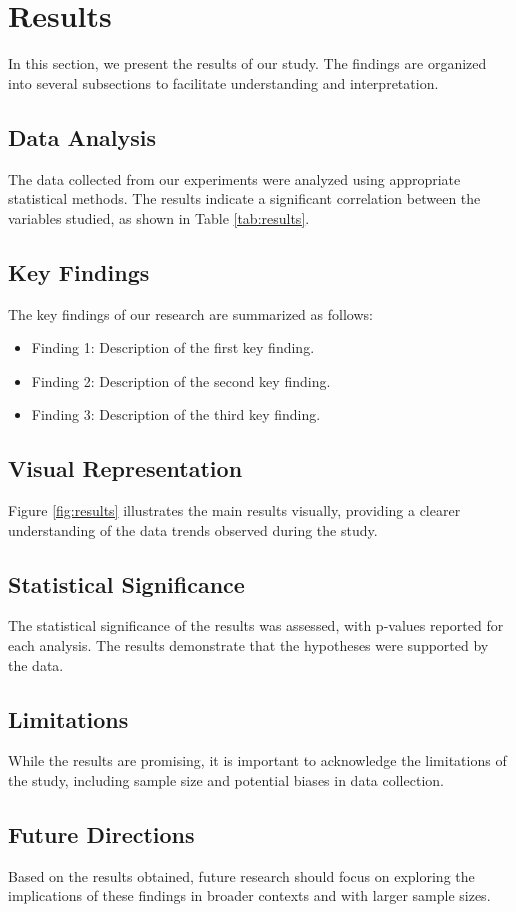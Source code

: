 

\section{Results}

In this section, we present the results of our study. The findings are organized into several subsections to facilitate understanding and interpretation.

\subsection{Data Analysis}
The data collected from our experiments were analyzed using appropriate statistical methods. The results indicate a significant correlation between the variables studied, as shown in Table \ref{tab:results}.

\subsection{Key Findings}
The key findings of our research are summarized as follows:
\begin{itemize}
    \item Finding 1: Description of the first key finding.
    \item Finding 2: Description of the second key finding.
    \item Finding 3: Description of the third key finding.
\end{itemize}

\subsection{Visual Representation}
Figure \ref{fig:results} illustrates the main results visually, providing a clearer understanding of the data trends observed during the study.

\subsection{Statistical Significance}
The statistical significance of the results was assessed, with p-values reported for each analysis. The results demonstrate that the hypotheses were supported by the data.

\subsection{Limitations}
While the results are promising, it is important to acknowledge the limitations of the study, including sample size and potential biases in data collection.

\subsection{Future Directions}
Based on the results obtained, future research should focus on exploring the implications of these findings in broader contexts and with larger sample sizes.